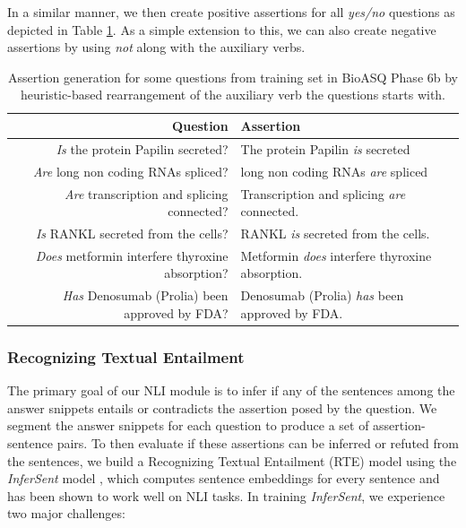 In a similar manner, we then create positive assertions for all \textit{yes/no} questions as depicted in Table \ref{tab:assertion_examples}. As a simple extension to this, we can also create negative assertions by using \textit{not} along with the auxiliary verbs.

\begin{table}[t!]
    \centering
    \begin{tabular}{r l} \hline
        Question & Assertion \\ \hline
    \textit{Is} the protein Papilin secreted? & The protein Papilin \textit{is} secreted \\
    \textit{Are} long non coding RNAs spliced? & 
    long non coding RNAs \textit{are} spliced \\
    \textit{Are} transcription and splicing connected? &
    Transcription and splicing \textit{are} connected. \\
    \textit{Is} RANKL secreted from the cells? &
    RANKL \textit{is} secreted from the cells. \\
    \textit{Does} metformin interfere thyroxine absorption? & 
    Metformin \textit{does} interfere thyroxine absorption. \\
    \textit{Has} Denosumab (Prolia) been approved by FDA? &
    Denosumab (Prolia) \textit{has} been approved by FDA. \\
    \hline
   \end{tabular}
    \caption{Assertion generation for some questions from training set in BioASQ Phase 6b by heuristic-based rearrangement of the auxiliary verb the questions starts with.}    \label{tab:assertion_examples}
\end{table}

\subsubsection{Recognizing Textual Entailment}

The primary goal of our NLI module is to infer if any of the sentences among the answer snippets entails or contradicts the assertion posed by the question. We segment the answer snippets for each question to produce a set of assertion-sentence pairs. To then evaluate if these assertions can be inferred or refuted from the sentences, we build a Recognizing Textual Entailment (RTE) model using the \textit{InferSent} model \cite{Infersent}, which computes sentence embeddings for every sentence and has been shown to work well on NLI tasks. In training \textit{InferSent}, we experience two major challenges:


